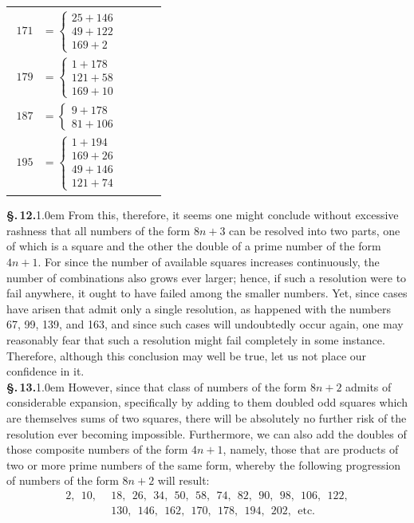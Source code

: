 \documentclass[12pt]{article}
\newcommand{\pnum}[1]{\textbf{\S.\,#1.}\kern1.0em}
\begin{document}
\begin{tabular}{l|l|l|l}
{\begin{align*}
        171 &= \begin{cases}
          25 + 146 \\ 49 + 122 \\ 169 + 2
        \end{cases} \\
        179 &= \begin{cases}
          1 + 178 \\ 121 + 58 \\ 169 + 10
        \end{cases} \\
        187 &= \begin{cases}
          9 + 178 \\ 81 + 106 
        \end{cases} \\
        195 &= \begin{cases}
          1 + 194 \\ 169 + 26 \\ 49 + 146 \\ 121 + 74
        \end{cases}
    \end{align*}}
\end{tabular}

\vspace{0.3cm}

\pnum{12} From this, therefore, it seems one might conclude without excessive rashness that all numbers of the form $8n + 3$ can be resolved into two parts, one of which is a square and the other the double of a prime number of the form $4n + 1$. For since the number of available squares increases continuously, the number of combinations also grows ever larger; hence, if such a resolution were to fail anywhere, it ought to have failed among the smaller numbers. Yet, since cases have arisen that admit only a single resolution, as happened with the numbers 67, 99, 139, and 163, and since such cases will undoubtedly occur again, one may reasonably fear that such a resolution might fail completely in some instance. Therefore, although this conclusion may well be true, let us not place our confidence in it. \\

\pnum{13} However, since that class of numbers of the form $8n + 2$ admits of considerable expansion, specifically by adding to them doubled odd squares which are themselves sums of two squares, there will be absolutely no further risk of the resolution ever becoming impossible. Furthermore, we can also add the doubles of those composite numbers of the form $4n + 1$, namely, those that are products of two or more prime numbers of the same form, whereby the following progression of numbers of the form $8n + 2$ will result:
\begin{align*}
  2, \ \ 10, \ \ &18, \ \ 26, \ \ 34, \ \ 50, \ \ 58, \ \ 74, \ \ 82, \ \ 90, \ \ 98, \ \ 106, \ \ 122, \\
  &130, \ \ 146, \ \ 162, \ \ 170, \ \ 178, \ \ 194, \ \ 202, \ \ \text{etc.} \\
\end{align*}
\end{document}
